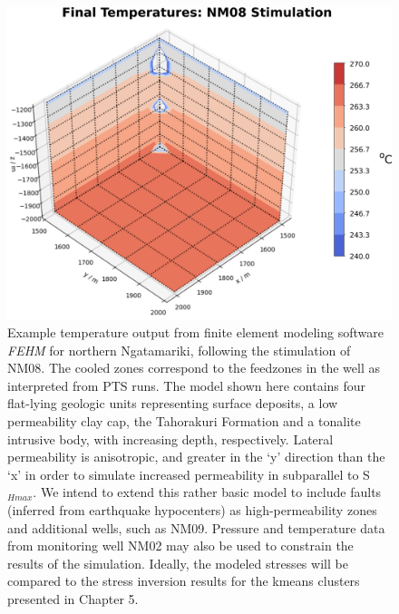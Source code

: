 \begin{figure}[h!]
\begin{center}
\includegraphics[width=1.00\columnwidth]{Chapter_6_Synthesis/figures/modeling_results/NM08_FEHM_output}
\caption[Example \textit{FEHM} temperature output]{{
Example temperature output from finite element modeling software \textit{FEHM} \citep{zyvoloski2007fehm} for northern Ngatamariki, following the \gls{stimulation} of NM08. The cooled zones correspond to the \glspl{feedzone} in the well as interpreted from \acrshort{PTS} runs. The model shown here contains four flat-lying geologic units representing surface deposits, a low \gls{permeability} clay cap, the Tahorakuri Formation and a tonalite intrusive body, with increasing depth, respectively. Lateral \gls{permeability} is anisotropic, and greater in the `y' direction than the `x' in order to simulate increased \gls{permeability} in subparallel to S$_{Hmax}$. We intend to extend this rather basic model to include faults (inferred from earthquake hypocenters) as high-permeability zones and additional wells, such as NM09. Pressure and temperature data from monitoring well NM02 may also be used to constrain the results of the simulation. Ideally, the modeled stresses will be compared to the stress inversion results for the kmeans clusters presented in Chapter 5.
{\label{modeling}}%
}}
\end{center}
\end{figure}

